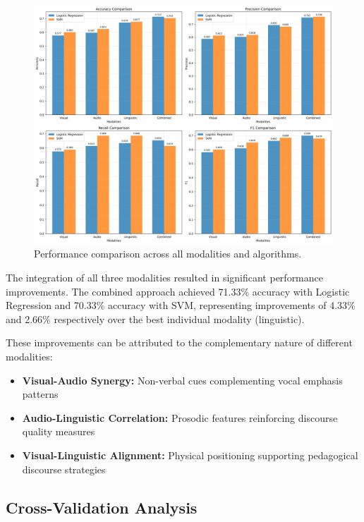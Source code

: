 \begin{figure}[H]
    \centering
    \includegraphics[width=\textwidth]{sections/performance_comparison.jpg}
    \caption{Performance comparison across all modalities and algorithms.}
    \label{fig:performance_comparison}
\end{figure}

The integration of all three modalities resulted in significant performance improvements. The combined approach achieved 71.33\% accuracy with Logistic Regression and 70.33\% accuracy with SVM, representing improvements of 4.33\% and 2.66\% respectively over the best individual modality (linguistic).

These improvements can be attributed to the complementary nature of different modalities:
\begin{itemize}
    \item \textbf{Visual-Audio Synergy:} Non-verbal cues complementing vocal emphasis patterns
    \item \textbf{Audio-Linguistic Correlation:} Prosodic features reinforcing discourse quality measures
    \item \textbf{Visual-Linguistic Alignment:} Physical positioning supporting pedagogical discourse strategies
\end{itemize}

\subsection{Cross-Validation Analysis}

